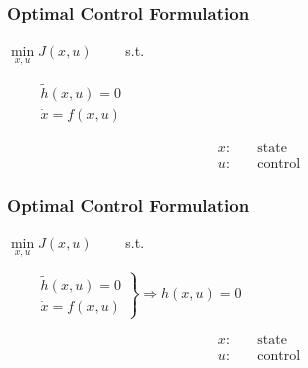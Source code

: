 \begin{frame}
	\frametitle{Optimal Control Formulation}
	\begin{block}{}
		\begin{center}
		 \parbox{9.5cm}{\( \min \limits_{x,u} J(x,u) \qquad  \) s.t. \parbox{\textwidth}{
				\( \qquad \left. \begin{array}{c} \tilde{h}(x,u)=0 \\  \dot{x} = f(x,u) \end{array} \right.\)	}}
				\begin{align*}
					x: & \quad \text{state} \\
					u: & \quad \text{control}
				\end{align*}
		\end{center}
	\end{block}
\end{frame}

\begin{frame}
	\frametitle{Optimal Control Formulation}
	\begin{block}{}
		\begin{center}
		 \parbox{9.5cm}{\( \min \limits_{x,u} J(x,u) \qquad  \) s.t. \parbox{\textwidth}{
				\( \qquad \left. \begin{array}{c} \tilde{h}(x,u)=0 \\  \dot{x} = f(x,u) \end{array} \right\} \Rightarrow h(x,u) = 0 \)	}}
				\begin{align*}
					x: & \quad \text{state} \\
					u: & \quad \text{control}
				\end{align*}
		\end{center}
	\end{block}
\end{frame}

